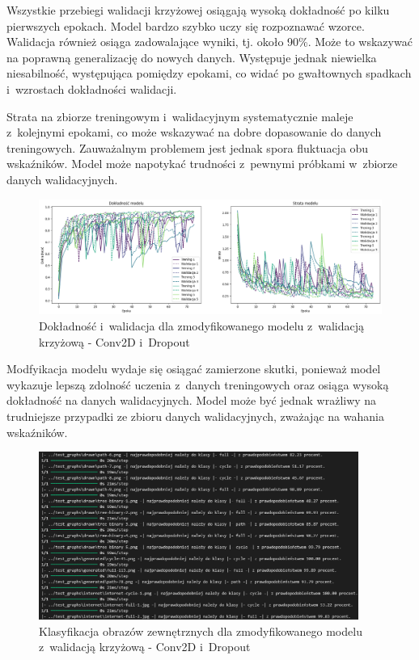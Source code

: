 Wszystkie przebiegi walidacji krzyżowej osiągają wysoką dokładność po kilku pierwszych epokach.
Model bardzo szybko uczy się rozpoznawać wzorce.
Walidacja również osiąga zadowalające wyniki, tj. około 90\%. Może to wskazywać na poprawną generalizację do nowych danych.
Występuje jednak niewielka niesabilność, występująca pomiędzy epokami,
co widać po gwałtownych spadkach i~wzrostach dokładności walidacji.

Strata na zbiorze treningowym i~walidacyjnym systematycznie maleje z~kolejnymi epokami,
co może wskazywać na dobre dopasowanie do danych treningowych.
Zauważalnym problemem jest jednak spora fluktuacja obu wskaźników.
Model może napotykać trudności z~pewnymi próbkami w~zbiorze danych walidacyjnych. 

\begin{figure}[ht]
	\centering
	\includegraphics[width=15.5cm]{resources/tests/images/v4/crossvalid_1_img.png}
	\caption{Dokładność i~walidacja dla zmodyfikowanego modelu z~walidacją krzyżową - Conv2D i~Dropout}
	\label{Fig:tests-cv-1a}
\end{figure}
\FloatBarrier

Modfyikacja modelu wydaje się osiągać zamierzone skutki,
ponieważ model wykazuje lepszą zdolność uczenia z~danych treningowych
oraz osiąga wysoką dokładność na danych walidacyjnych.
Model może być jednak wrażliwy na trudniejsze przypadki ze zbioru danych walidacyjnych,
zważając na wahania wskaźników.

\begin{figure}[ht]
	\centering
	\includegraphics[height=5.5cm]{resources/tests/images/v4/crossvalid_1_txt.png}
	\caption{Klasyfikacja obrazów zewnętrznych dla zmodyfikowanego modelu z~walidacją krzyżową - Conv2D i~Dropout}
	\label{Fig:tests-cv-1b}
\end{figure}
\FloatBarrier

